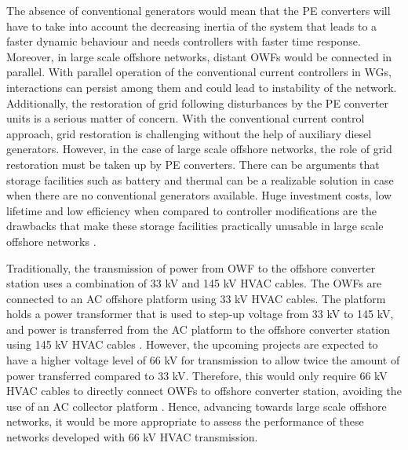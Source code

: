 The absence of conventional generators would mean that the \gls{PE} converters will have to take into account the decreasing inertia of the system that leads to a faster dynamic behaviour and needs controllers with faster time response. Moreover, in large scale offshore networks, distant \gls{OWF}s would be connected in parallel. With parallel operation of the conventional current controllers in \gls{WG}s, interactions can persist among them and could lead to instability of the network. Additionally, the restoration of grid following disturbances by the \gls{PE} converter units is a serious matter of concern. With the conventional current control approach, grid restoration is challenging without the help of auxiliary diesel generators. However, in the case of large scale offshore networks, the role of grid restoration must be taken up by \gls{PE} converters. There can be arguments that storage facilities such as battery and thermal can be a realizable solution in case when there are no conventional generators available. Huge investment costs, low lifetime and low efficiency when compared to controller modifications are the drawbacks that make these storage facilities practically unusable in large scale offshore networks \cite{telaretti_economic_2016}.

Traditionally, the transmission of power from \gls{OWF} to the offshore converter station uses a combination of 33 kV and 145 kV \gls{HVAC} cables. The \gls{OWF}s are connected to an \gls{AC} offshore platform using 33 kV \gls{HVAC} cables. The platform holds a power transformer that is used to step-up voltage from 33 kV to 145 kV, and power is transferred from the \gls{AC} platform to the offshore converter station using 145 kV \gls{HVAC} cables \cite{abdelwahed2016power}. However, the upcoming projects are expected to have a higher voltage level of 66 kV for transmission to allow twice the amount of power transferred compared to 33 kV. Therefore, this would only require 66 kV \gls{HVAC} cables to directly connect \gls{OWF}s to offshore converter station, avoiding the use of an \gls{AC} collector platform \cite{dnv66kv}. Hence, advancing towards large scale offshore networks, it would be more appropriate to assess the performance of these networks developed with 66 kV \gls{HVAC} transmission. 


